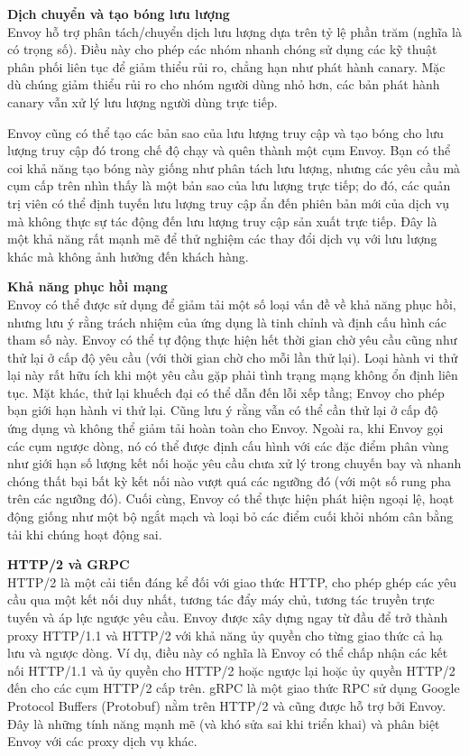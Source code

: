 \documentclass[12pt,a4paper]{report}
\begin{document}
		\textbf{Dịch chuyển và tạo bóng lưu lượng}\\
		Envoy hỗ trợ phân tách/chuyển dịch lưu lượng dựa trên tỷ lệ phần trăm (nghĩa là có trọng số). Điều này cho phép các nhóm nhanh chóng sử dụng các kỹ thuật phân phối liên tục để giảm thiểu rủi ro, chẳng hạn như phát hành canary. Mặc dù chúng giảm thiểu rủi ro cho nhóm người dùng nhỏ hơn, các bản phát hành canary vẫn xử lý lưu lượng người dùng trực tiếp.
		
		Envoy cũng có thể tạo các bản sao của lưu lượng truy cập và tạo bóng cho lưu lượng truy cập đó trong chế độ chạy và quên thành một cụm Envoy. Bạn có thể coi khả năng tạo bóng này giống như phân tách lưu lượng, nhưng các yêu cầu mà cụm cấp trên nhìn thấy là một bản sao của lưu lượng trực tiếp; do đó, các quản trị viên có thể định tuyến lưu lượng truy cập ẩn đến phiên bản mới của dịch vụ mà không thực sự tác động đến lưu lượng truy cập sản xuất trực tiếp. Đây là một khả năng rất mạnh mẽ để thử nghiệm các thay đổi dịch vụ với lưu lượng khác mà không ảnh hưởng đến khách hàng.
		
		\textbf{Khả năng phục hồi mạng}\\
		Envoy có thể được sử dụng để giảm tải một số loại vấn đề về khả năng phục hồi, nhưng lưu ý rằng trách nhiệm của ứng dụng là tinh chỉnh và định cấu hình các tham số này. Envoy có thể tự động thực hiện hết thời gian chờ yêu cầu cũng như thử lại ở cấp độ yêu cầu (với thời gian chờ cho mỗi lần thử lại). Loại hành vi thử lại này rất hữu ích khi một yêu cầu gặp phải tình trạng mạng không ổn định liên tục. Mặt khác, thử lại khuếch đại có thể dẫn đến lỗi xếp tầng; Envoy cho phép bạn giới hạn hành vi thử lại. Cũng lưu ý rằng vẫn có thể cần thử lại ở cấp độ ứng dụng và không thể giảm tải hoàn toàn cho Envoy. Ngoài ra, khi Envoy gọi các cụm ngược dòng, nó có thể được định cấu hình với các đặc điểm phân vùng như giới hạn số lượng kết nối hoặc yêu cầu chưa xử lý trong chuyến bay và nhanh chóng thất bại bất kỳ kết nối nào vượt quá các ngưỡng đó (với một số rung pha trên các ngưỡng đó). Cuối cùng, Envoy có thể thực hiện phát hiện ngoại lệ, hoạt động giống như một bộ ngắt mạch và loại bỏ các điểm cuối khỏi nhóm cân bằng tải khi chúng hoạt động sai.
		
		\textbf{HTTP/2 và GRPC}\\
		HTTP/2 là một cải tiến đáng kể đối với giao thức HTTP, cho phép ghép các yêu cầu qua một kết nối duy nhất, tương tác đẩy máy chủ, tương tác truyền trực tuyến và áp lực ngược yêu cầu. Envoy được xây dựng ngay từ đầu để trở thành proxy HTTP/1.1 và HTTP/2 với khả năng ủy quyền cho từng giao thức cả hạ lưu và ngược dòng. Ví dụ, điều này có nghĩa là Envoy có thể chấp nhận các kết nối HTTP/1.1 và ủy quyền cho HTTP/2 hoặc ngược lại hoặc ủy quyền HTTP/2 đến cho các cụm HTTP/2 cấp trên. gRPC là một giao thức RPC sử dụng Google Protocol Buffers (Protobuf) nằm trên HTTP/2 và cũng được hỗ trợ bởi Envoy. Đây là những tính năng mạnh mẽ (và khó sửa sai khi triển khai) và phân biệt Envoy với các proxy dịch vụ khác.
		
\end{document}
